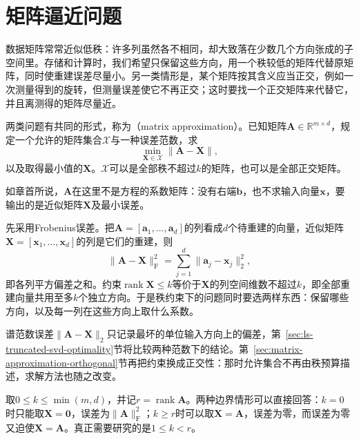 
\section{矩阵逼近问题}
\label{sec:matrix-approximation-problem}

数据矩阵常常近似低秩：许多列虽然各不相同，却大致落在少数几个方向张成的子空间里。存储和计算时，我们希望只保留这些方向，用一个秩较低的矩阵代替原矩阵，同时使重建误差尽量小。另一类情形是，某个矩阵按其含义应当正交，例如一次测量得到的旋转，但测量误差使它不再正交；这时要找一个正交矩阵来代替它，并且离测得的矩阵尽量近。

两类问题有共同的形式，称为（matrix approximation）。已知矩阵$\bm A\in\mathbb R^{m\times d}$，规定一个允许的矩阵集合$\mathcal X$与一种误差范数，求
\[
 \min_{\bm X\in\mathcal X}\lVert\bm A-\bm X\rVert ,
\]
以及取得最小值的$\bm X$。$\mathcal X$可以是全部秩不超过$k$的矩阵，也可以是全部正交矩阵。

如章首所说，$\bm A$在这里不是方程的系数矩阵：没有右端$\bm b$，也不求输入向量$\bm x$，要输出的是近似矩阵$\bm X$及最小误差。

先采用Frobenius误差。把$\bm A=[\bm a_1,\ldots,\bm a_d]$的列看成$d$个待重建的向量，近似矩阵$\bm X=[\bm x_1,\ldots,\bm x_d]$的列是它们的重建，则
\[
 \lVert\bm A-\bm X\rVert_{\mathrm F}^2=\sum_{j=1}^d\lVert\bm a_j-\bm x_j\rVert_2^2 ,
\]
即各列平方偏差之和。约束$\operatorname{rank}\bm X\leq k$等价于$\bm X$的列空间维数不超过$k$，即全部重建向量共用至多$k$个独立方向。于是秩约束下的问题同时要选两样东西：保留哪些方向，以及每一列在这些方向上取什么系数。

谱范数误差$\lVert\bm A-\bm X\rVert_2$只记录最坏的单位输入方向上的偏差，第~\ref{sec:ls-truncated-svd-optimality}节将比较两种范数下的结论。第~\ref{sec:matrix-approximation-orthogonal}节再把约束换成正交性：那时允许集合不再由秩预算描述，求解方法也随之改变。

取$0\leq k\leq\min(m,d)$，并记$r=\operatorname{rank}\bm A$。两种边界情形可以直接回答：$k=0$时只能取$\bm X=\bm0$，误差为$\lVert\bm A\rVert_{\mathrm F}^2$；$k\geq r$时可以取$\bm X=\bm A$，误差为零，而误差为零又迫使$\bm X=\bm A$。真正需要研究的是$1\leq k<r$。

